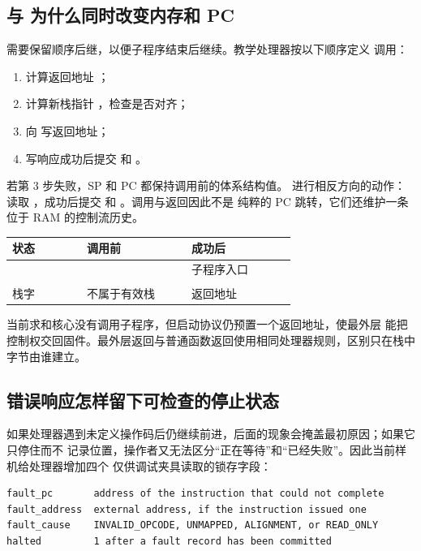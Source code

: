 \subsection{ 与  为什么同时改变内存和 PC}

 需要保留顺序后继，以便子程序结束后继续。教学处理器按以下顺序定义
调用：

\begin{enumerate}
\item 计算返回地址 ；
\item 计算新栈指针 ，检查是否对齐；
\item 向  写返回地址；
\item 写响应成功后提交  和 。
\end{enumerate}

若第 3 步失败，SP 和 PC 都保持调用前的体系结构值。 进行相反方向的动作：读取
，成功后提交  和 。调用与返回因此不是
纯粹的 PC 跳转，它们还维护一条位于 RAM 的控制流历史。

\begin{longtable}{|L{0.20\linewidth}|L{0.29\linewidth}|L{0.29\linewidth}|}
\hline
{}
状态 & 调用前 &  成功后 \\ \hline
{} &  & 子程序入口  \\ \hline
{} &  &  \\ \hline
栈字  & 不属于有效栈 & 返回地址  \\ \hline
\end{longtable}

当前求和核心没有调用子程序，但启动协议仍预置一个返回地址，使最外层  能把
控制权交回固件。最外层返回与普通函数返回使用相同处理器规则，区别只在栈中字节由谁建立。

\subsection{错误响应怎样留下可检查的停止状态}

如果处理器遇到未定义操作码后仍继续前进，后面的现象会掩盖最初原因；如果它只停住而不
记录位置，操作者又无法区分“正在等待”和“已经失败”。因此当前样机给处理器增加四个
仅供调试夹具读取的锁存字段：

\begin{lstlisting}
fault_pc       address of the instruction that could not complete
fault_address  external address, if the instruction issued one
fault_cause    INVALID_OPCODE, UNMAPPED, ALIGNMENT, or READ_ONLY
halted         1 after a fault record has been committed
\end{lstlisting}

